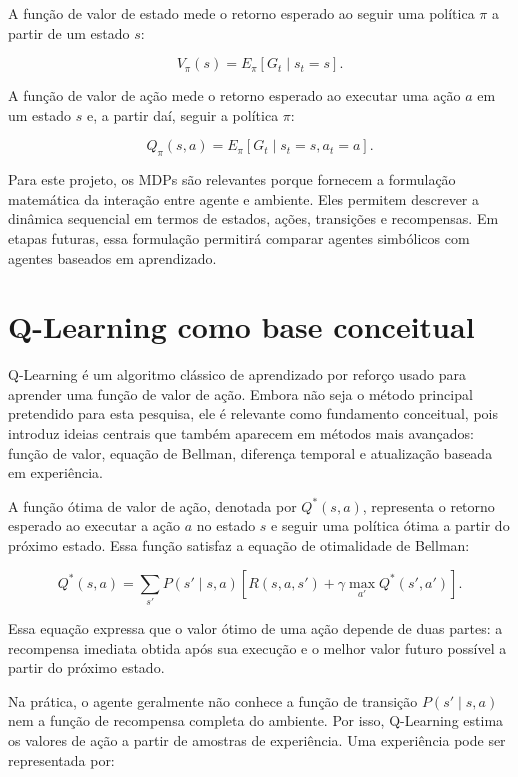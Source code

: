 A função de valor de estado mede o retorno esperado ao seguir uma política
$\pi$ a partir de um estado $s$:

\begin{equation}
V_{\pi}(s) =
E_{\pi}[G_t \mid s_t = s].
\end{equation}

A função de valor de ação mede o retorno esperado ao executar uma ação $a$ em
um estado $s$ e, a partir daí, seguir a política $\pi$:

\begin{equation}
Q_{\pi}(s,a) =
E_{\pi}[G_t \mid s_t = s, a_t = a].
\end{equation}

Para este projeto, os MDPs são relevantes porque fornecem a formulação
matemática da interação entre agente e ambiente.
Eles permitem descrever a dinâmica sequencial em termos de estados, ações,
transições e recompensas.
Em etapas futuras, essa formulação permitirá comparar agentes simbólicos com
agentes baseados em aprendizado.

\section{Q-Learning como base conceitual}

Q-Learning é um algoritmo clássico de aprendizado por reforço usado para
aprender uma função de valor de ação.
Embora não seja o método principal pretendido para esta pesquisa, ele é relevante
como fundamento conceitual, pois introduz ideias centrais que também aparecem em
métodos mais avançados: função de valor, equação de Bellman, diferença temporal e
atualização baseada em experiência.

A função ótima de valor de ação, denotada por $Q^*(s,a)$, representa o retorno
esperado ao executar a ação $a$ no estado $s$ e seguir uma política ótima a
partir do próximo estado.
Essa função satisfaz a equação de otimalidade de Bellman:

\begin{equation}
Q^*(s,a) =
\sum_{s'} P(s' \mid s,a)
\left[
R(s,a,s')
+
\gamma \max_{a'} Q^*(s',a')
\right].
\end{equation}

Essa equação expressa que o valor ótimo de uma ação depende de duas partes:
a recompensa imediata obtida após sua execução e o melhor valor futuro
possível a partir do próximo estado.

Na prática, o agente geralmente não conhece a função de transição
$P(s' \mid s,a)$ nem a função de recompensa completa do ambiente.
Por isso, Q-Learning estima os valores de ação a partir de amostras de experiência.
Uma experiência pode ser representada por:

